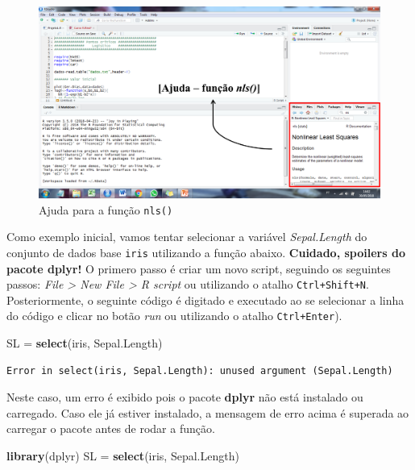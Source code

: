 \documentclass[]{book}
\newenvironment{Shaded}{\begin{snugshade}}{\end{snugshade}}
\newcommand{\KeywordTok}[1]{\textcolor[rgb]{0.13,0.29,0.53}{\textbf{#1}}}
\newcommand{\NormalTok}[1]{#1}
\newcommand{\StringTok}[1]{\textcolor[rgb]{0.31,0.60,0.02}{#1}}
\begin{document}
\begin{figure}
\centering
\includegraphics{figures/Help.png}
\caption{Ajuda para a função \texttt{nls()}}
\end{figure}

Como exemplo inicial, vamos tentar selecionar a variável \emph{Sepal.Length} do conjunto de dados base \texttt{iris} utilizando a função abaixo. \textbf{Cuidado, spoilers do pacote dplyr!} O primero passo é criar um novo script, seguindo os seguintes passos: \emph{File \textgreater{} New File \textgreater{} R script} ou utilizando o atalho \texttt{Ctrl+Shift+N}. Posteriormente, o seguinte código é digitado e executado ao se selecionar a linha do código e clicar no botão \emph{run} ou utilizando o atalho \texttt{Ctrl+Enter}).

\begin{Shaded}
\begin{Highlighting}[]
\NormalTok{SL =}\StringTok{ }\KeywordTok{select}\NormalTok{(iris, Sepal.Length)}
\end{Highlighting}
\end{Shaded}

\begin{verbatim}
Error in select(iris, Sepal.Length): unused argument (Sepal.Length)
\end{verbatim}

Neste caso, um erro é exibido pois o pacote \textbf{dplyr} não está instalado ou carregado. Caso ele já estiver instalado, a mensagem de erro acima é superada ao carregar o pacote antes de rodar a função.

\begin{Shaded}
\begin{Highlighting}[]
\KeywordTok{library}\NormalTok{(dplyr)}
\NormalTok{SL =}\StringTok{ }\KeywordTok{select}\NormalTok{(iris, Sepal.Length)}
\end{Highlighting}
\end{Shaded}
\end{document}
